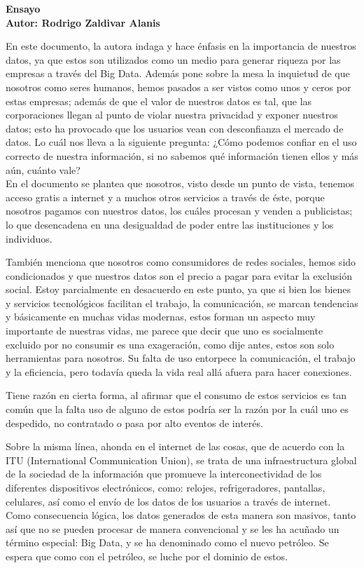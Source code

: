 \documentclass[12pt]{report}
\begin{document}
\begin{enumerate}[label=\textbf{\arabic*.}, leftmargin=*]
\newpage
\textbf{Ensayo\\
        Autor: Rodrigo Zaldivar Alanis}

En este documento, la autora indaga y hace énfasis en la importancia de nuestros datos, ya que estos son utilizados como un medio para generar riqueza por las empresas a través del Big Data. Además pone sobre la mesa la inquietud de que nosotros como seres humanos, hemos pasados a ser vistos como unos y ceros por estas empresas; además de que el valor de nuestros datos es tal, que las corporaciones llegan al punto de violar nuestra privacidad y exponer nuestros datos; esto ha provocado que los usuarios vean con desconfianza el mercado de datos. Lo cuál nos lleva a la siguiente pregunta: ¿Cómo podemos confiar en el uso correcto de nuestra información, si no sabemos qué información tienen ellos y más aún, cuánto vale?\\

En el documento se plantea que nosotros, visto desde un punto de vista, tenemos acceso gratis a internet y a muchos otros servicios a través de éste, porque nosotros pagamos con nuestros datos, los cuáles procesan y venden a publicistas; lo que desencadena en una desigualdad de poder entre las instituciones y los individuos.

También menciona que nosotros como consumidores de redes sociales, hemos sido condicionados y que nuestros datos son el precio a pagar para evitar la exclusión social. Estoy parcialmente en desacuerdo en este punto, ya que si bien los bienes y servicios tecnológicos facilitan el trabajo, la comunicación, se marcan tendencias y básicamente en muchas vidas modernas, estos forman un aspecto muy importante de nuestras vidas, me parece que decir que uno es socialmente excluido por no consumir  es una exageración, como dije antes, estos son solo herramientas para nosotros. Su falta de uso entorpece la comunicación, el trabajo y la eficiencia, pero todavía queda la vida real allá afuera para hacer conexiones.

Tiene razón en cierta forma, al afirmar que el consumo de estos servicios es tan común que la falta uso de alguno de estos podría ser la razón por la cuál uno es despedido, no contratado o pasa por alto eventos de interés.

Sobre la misma línea, ahonda en el internet de las cosas, que de acuerdo con la ITU (International Communication Union), se trata de una infraestructura global de la sociedad de la información que promueve la interconectividad de los diferentes dispositivos electrónicos, como: relojes, refrigeradores, pantallas, celulares, así como el envío de los datos de los usuarios a través de internet. Como consecuencia lógica, los datos generados de esta manera son masivos, tanto así que no se pueden procesar de manera convencional y se les ha acuñado un término especial: Big Data, y se ha denominado como el nuevo petróleo. Se espera que como con el petróleo, se luche por el dominio de estos.


\end{enumerate}
\end{document}
